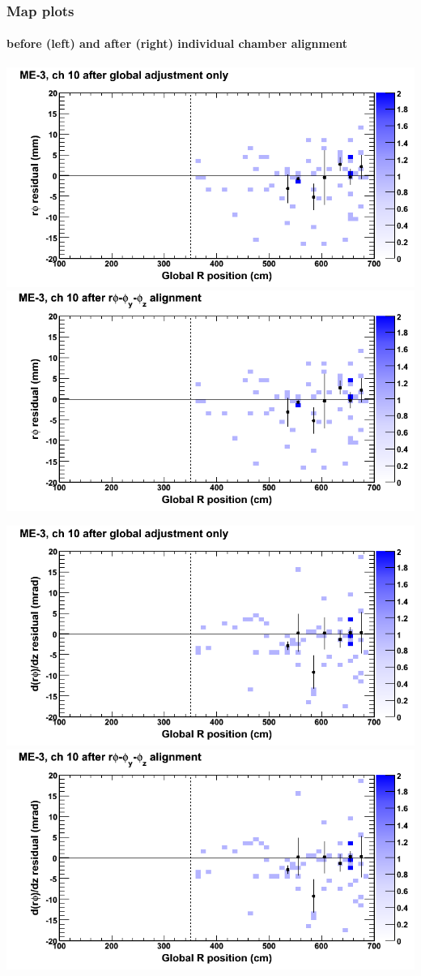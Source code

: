 \documentclass[compress]{beamer}
\begin{document}
\begin{frame}
\frametitle{Map plots}
\framesubtitle{before (left) and after (right) individual chamber alignment}
\includegraphics[width=0.5\linewidth]{ringmapplots_3dof/before_CSCvsr_mem3ch10_x.png} \includegraphics[width=0.5\linewidth]{ringmapplots_3dof/after_CSCvsr_mem3ch10_x.png}

\includegraphics[width=0.5\linewidth]{ringmapplots_3dof/before_CSCvsr_mem3ch10_dxdz.png} \includegraphics[width=0.5\linewidth]{ringmapplots_3dof/after_CSCvsr_mem3ch10_dxdz.png}
\end{frame}
\end{document}
